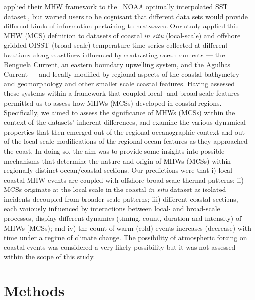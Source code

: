 \documentclass[a4paper,10pt,review]{elsarticle}
\begin{document}
\citet{Hobday2016} applied their MHW framework to the \degree~NOAA optimally interpolated SST dataset \citep[hereafter referred to as OISST;][]{Reynolds2007}, but warned users to be cognisant that different data sets would provide different kinds of information pertaining to heatwaves. Our study applied this MHW (MCS) definition to datasets of coastal \emph{in situ} (local-scale) and offshore gridded OISST (broad-scale) temperature time series collected at different locations along coastlines influenced by contrasting ocean currents --- the Benguela Current, an eastern boundary upwelling system, and the Agulhas Current --- and locally modified by regional aspects of the coastal bathymetry and geomorphology and other smaller scale coastal features. Having assessed these systems within a framework that coupled local- and broad-scale features permitted us to assess how MHWs (MCSs) developed in coastal regions. Specifically, we aimed to assess the significance of MHWs (MCSs) within the context of the datasets’ inherent differences, and examine the various dynamical properties that then emerged out of the regional oceanographic context and out of the local-scale modifications of the regional ocean features as they approached the coast. In doing so, the aim was to provide some insights into possible mechanisms that determine the nature and origin of MHWs (MCSs) within regionally distinct ocean/coastal sections. Our predictions were that i) local coastal MHW events are coupled with offshore broad-scale thermal patterns; ii) MCSs originate at the local scale in the coastal \emph{in situ} dataset as isolated incidents decoupled from broader-scale patterns; iii) different coastal sections, each variously influenced by interactions between local- and broad-scale processes, display different dynamics (timing, count, duration and intensity) of MHWs (MCSs); and iv) the count of warm (cold) events increases (decrease) with time under a regime of climate change. The possibility of atmospheric forcing on coastal events was considered a very likely possibility but it was not assessed within the scope of this study.

\section{Methods}
\end{document}
